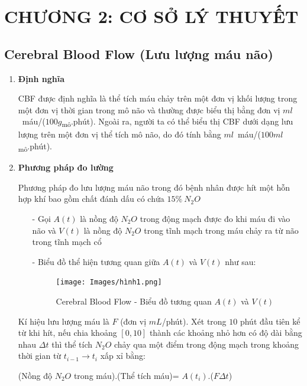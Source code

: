 \documentclass[12pt,a4paper]{article}
\begin{document}
\section*{CHƯƠNG 2: CƠ SỞ LÝ THUYẾT}
\setcounter{section}{2}
\subsection{Cerebral Blood Flow (Lưu lượng máu não)}
\begin{enumerate}[a/]
	\item \textbf{Định nghĩa}
	      \begin{flushleft}
		      CBF được định nghĩa là thể tích máu chảy trên một đơn vị khối lượng trong
		      một đơn vị thời gian trong mô não và thường được biểu thị bằng đơn vị $ml$\ máu/($100g$\textsubscript{mô}.phút).
		      Ngoài ra, người ta có thể biểu thị CBF dưới dạng lưu lượng trên một đơn vị thể tích mô não,
		      do đó tính bằng $ml$\ máu/($100ml$\textsubscript{mô}.phút).
	      \end{flushleft}
	\item \textbf{Phương pháp đo lường}
	      \begin{flushleft}
		      Phương pháp đo lưu lượng máu não trong đó bệnh nhân được
		      hít một hỗn hợp khí bao gồm chất đánh dấu có chứa $15\%\ N_2O$
		      \begin{itemize}
			      \item[-] 	Gọi $A(t)$ là nồng độ $N_2O$ trong động mạch được đo khi máu đi vào não và $V(t)$ là nồng độ $N_2O$ trong tĩnh mạch trong máu chảy ra từ não trong tĩnh mạch cổ
			      \item[-] 	Biểu đồ thể hiện tương quan giữa $A(t)$ và $V(t)$ như sau:
			            \begin{figure} [ht]
				            \centering
				            \texttt{[image: Images/hình1.png]}
				            \caption{Cerebral Blood Flow - Biểu đồ tương quan $A(t)$ và $V(t)$}
				            \label{enter-label}
			            \end{figure}
		      \end{itemize}
		      Kí hiệu lưu lượng máu là $F$ (đơn vị $mL$/phút). Xét trong $10$ phút đầu tiên
		      kể từ khi hít, nếu chia khoảng $\left[0,10\right]$ thành các khoảng nhỏ hơn có độ dài bằng nhau $\Delta t$ thì
		      thể tích $N_2O$ chảy qua một điểm trong động mạch trong khoảng thời gian từ $t_{i-1} \to t_i$ xấp xỉ bằng:
	      \end{flushleft}
	      \begin{center}
		      (Nồng độ $N_2O$ trong máu).(Thể tích máu)= $A(t_i)$.($F \Delta t$)

\end{center}
\end{enumerate}
\end{document}
